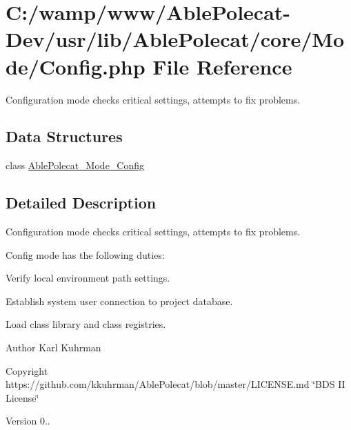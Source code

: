 \hypertarget{_config_8php}{}\section{C\+:/wamp/www/\+Able\+Polecat-\/\+Dev/usr/lib/\+Able\+Polecat/core/\+Mode/\+Config.php File Reference}
\label{_config_8php}


Configuration mode checks critical settings, attempts to fix problems.  


\subsection*{Data Structures}
\begin{DoxyCompactItemize}
\item 
class \hyperlink{class_able_polecat___mode___config}{Able\+Polecat\+\_\+\+Mode\+\_\+\+Config}
\end{DoxyCompactItemize}


\subsection{Detailed Description}
Configuration mode checks critical settings, attempts to fix problems. 

Config mode has the following duties\+:
\begin{DoxyEnumerate}
\item Verify local environment path settings.
\item Establish system user connection to project database.
\item Load class library and class registries.
\end{DoxyEnumerate}

\begin{DoxyAuthor}{Author}
Karl Kuhrman 
\end{DoxyAuthor}
\begin{DoxyCopyright}{Copyright}
https\+://github.com/kkuhrman/\+Able\+Polecat/blob/master/\+L\+I\+C\+E\+N\+S\+E.\+md \char`\"{}\+B\+D\+S I\+I License\char`\"{} 
\end{DoxyCopyright}
\begin{DoxyVersion}{Version}
0.. 
\end{DoxyVersion}
